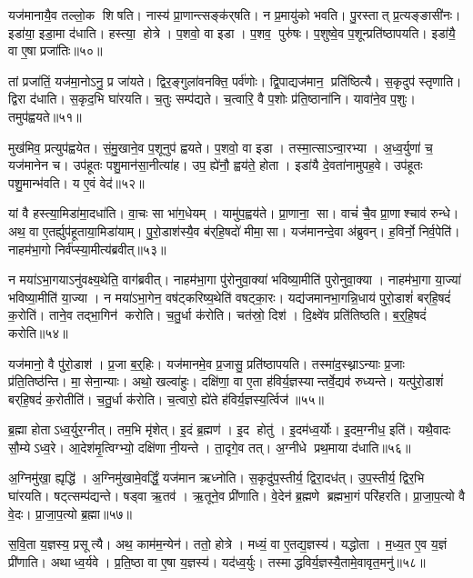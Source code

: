 यज॑मानायै॒व तल्लो॒क शिषति।
नास्य॑ प्रा॒णान्त्सङ्क॑र्‌षति।
न प्र॒मायु॑को भवति।
पु॒रस्तात् प्र॒त्यङ्ङासी॑नः।
इडा॑या॒ इडा॒मा द॑धाति।
हस्त्या॒ होत्रे।
प॒शवो॒ वा इडा।
प॒शव॒ पुरु॑षः।
प॒शुष्वे॒व प॒शून्प्रति॑ष्ठापयति।
इडा॑यै॒ वा ए॒षा प्रजा॑तिः॥५०॥

तां प्रजा॑तिं॒ यज॑मा॒नोऽनु॒ प्र जा॑यते।
द्विर॒ङ्गुला॑वनक्ति॒ पर्व॑णोः।
द्वि॒पाद्यज॑मान॒ प्रति॑ष्ठित्यै।
स॒कृदुप॑ स्तृणाति।
द्विरा द॑धाति।
स॒कृद॒भि घा॑रयति।
च॒तुः सम्प॑द्यते।
च॒त्वारि॒ वै प॒शोः प्र॑ति॒ष्ठाना॑नि।
यावा॑ने॒व प॒शुः।
तमुप॑ह्वयते॥५१॥

मुख॑मिव॒ प्रत्युप॑ह्वयेत।
सं॒मु॒खाने॒व प॒शूनुप॑ ह्वयते।
प॒शवो॒ वा इडा।
तस्मा॒त्साऽन्वा॒रभ्या।
अ॒ध्व॒र्युणा॑ च॒ यज॑मानेन च।
उप॑हूतः पशु॒मान॑सा॒नीत्या॑ह।
उप॒ ह्ये॑नौ॒ ह्वय॑ते॒ होता।
इडा॑यै दे॒वता॑नामुपह॒वे।
उप॑हूतः पशु॒मान्भ॑वति।
य ए॒वं वेद॑॥५२॥

यां वै हस्त्या॒मिडा॑मा॒दधा॑ति।
वा॒चः सा भा॑ग॒धेयम्।
यामु॑प॒ह्वय॑ते।
प्रा॒णाना॒ सा।
वाचं॑ चै॒व प्रा॒णाश्चाव॑ रुन्धे।
अथ॒ वा ए॒तर्ह्युप॑हूताया॒मिडा॑याम्।
पु॒रो॒डाश॑स्यै॒व ब॑र्‌हि॒षदो॑ मीमा॒सा।
यज॑मानन्दे॒वा अ॑ब्रुवन्।
ह॒विर्नो॒ निर्व॒पेति॑।
नाहम॑भा॒गो निर्व॑प्स्या॒मीत्य॑ब्रवीत्॥५३॥

न मया॑ऽभा॒गयाऽनु॑वक्ष्य॒थेति॒ वाग॑ब्रवीत्।
नाहम॑भा॒गा पु॑रोनुवा॒क्या॑ भविष्या॒मीति॑ पुरोनुवा॒क्या।
नाहम॑भा॒गा या॒ज्या॑ भविष्या॒मीति॑ या॒ज्या।
न मया॑ऽभा॒गेन॒ वष॑ट्करिष्य॒थेति॑ वषट्का॒रः।
यद्य॑जमानभा॒गन्नि॒धाय॑ पुरो॒डाशं॑ बर्‌हि॒षदं॑ क॒रोति॑।
ताने॒व तद्भा॒गिन॑ करोति।
च॒तु॒र्धा क॑रोति।
चत॑स्रो॒ दिश॑।
दि॒क्ष्वे॑व प्रति॑तिष्ठति।
ब॒र्॒हि॒षदं॑ करोति॥५४॥

यज॑मानो॒ वै पु॑रो॒डाश॑।
प्र॒जा ब॒र्॒हिः।
यज॑मानमे॒व प्र॒जासु॒ प्रति॑ष्ठापयति।
तस्मा॑द॒स्थ्नाऽन्याः प्र॒जाः प्र॑ति॒तिष्ठ॑न्ति।
मा॒सेना॒न्याः।
अथो॒ खल्वा॑हुः।
दक्षि॑णा॒ वा ए॒ता ह॑विर्य॒ज्ञस्यान्तर्वे॒द्यव॑ रुध्यन्ते।
यत्पु॑रो॒डाशं॑ बर्‌हि॒षदं॑ क॒रोतीति॑।
च॒तु॒र्धा क॑रोति।
च॒त्वारो॒ ह्ये॑ते ह॑विर्य॒ज्ञस्य॒र्त्विज॑॥५५॥

ब्र॒ह्मा होताऽध्व॒र्युर॒ग्नीत्।
तम॒भि मृ॑शेत्।
इ॒दं ब्र॒ह्मण॑।
इ॒द होतु॑।
इ॒दम॑ध्व॒र्योः।
इ॒दम॒ग्नीध॒ इति॑।
यथै॒वादः सौ॒म्येऽध्व॒रे।
आ॒देश॑मृ॒त्विग्भ्यो॒ दक्षि॑णा नी॒यन्ते।
ता॒दृगे॒व तत्।
अ॒ग्नीधे प्रथ॒माया द॑धाति॥५६॥

अ॒ग्निमु॑खा॒ ह्यृद्धि॑।
अ॒ग्निमु॑खामे॒वर्द्धिं॒ यज॑मान ऋध्नोति।
स॒कृदु॑प॒स्तीर्य॒ द्विरा॒दध॑त्।
उ॒प॒स्तीर्य॒ द्विर॒भि घा॑रयति।
षट्त्सम्प॑द्यन्ते।
षड्वा ऋ॒तव॑।
ऋ॒तूने॒व प्री॑णाति।
वे॒देन॑ ब्र॒ह्मणे ब्रह्मभा॒गं परि॑हरति।
प्रा॒जा॒प॒त्यो वै वे॒दः।
प्रा॒जा॒प॒त्यो ब्र॒ह्मा॥५७॥

स॒वि॒ता य॒ज्ञस्य॒ प्रसूत्यै।
अथ॒ काम॑म॒न्येन॑।
ततो॒ होत्रे।
मध्यं॒ वा ए॒तद्य॒ज्ञस्य॑।
यद्धोता।
म॒ध्य॒त ए॒व य॒ज्ञं प्री॑णाति।
अथाध्व॒र्यवे।
प्र॒ति॒ष्ठा वा ए॒षा य॒ज्ञस्य॑।
यद॑ध्व॒र्युः।
तस्माद्धविर्य॒ज्ञस्यै॒तामे॒वावृत॒मनु॑॥५८॥

